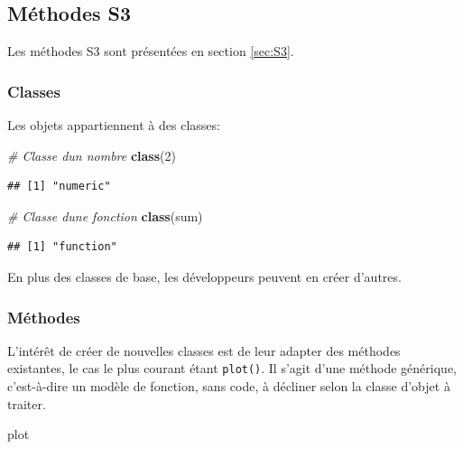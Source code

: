 \documentclass[
  12pt,
  french,
  a4paper,
  extrafontsizes,onecolumn,openright
  ]{memoir}
\newenvironment{Shaded}{\begin{snugshade}}{\end{snugshade}}
\newcommand{\CommentTok}[1]{\textcolor[rgb]{0.56,0.35,0.01}{\textit{#1}}}
\newcommand{\DecValTok}[1]{\textcolor[rgb]{0.00,0.00,0.81}{#1}}
\newcommand{\FunctionTok}[1]{\textcolor[rgb]{0.13,0.29,0.53}{\textbf{#1}}}
\newcommand{\NormalTok}[1]{#1}
\begin{document}
\subsection{Méthodes S3}\label{muxe9thodes-s3}

Les méthodes S3 sont présentées en section \ref{sec:S3}.

\subsubsection{Classes}\label{classes}

Les objets appartiennent à des classes:

\scriptsize

\begin{Shaded}
\begin{Highlighting}[]
\CommentTok{\# Classe d\textquotesingle{}un nombre}
\FunctionTok{class}\NormalTok{(}\DecValTok{2}\NormalTok{)}
\end{Highlighting}
\end{Shaded}

\begin{verbatim}
## [1] "numeric"
\end{verbatim}

\begin{Shaded}
\begin{Highlighting}[]
\CommentTok{\# Classe d\textquotesingle{}une fonction}
\FunctionTok{class}\NormalTok{(sum)}
\end{Highlighting}
\end{Shaded}

\begin{verbatim}
## [1] "function"
\end{verbatim}

\normalsize

En plus des classes de base, les développeurs peuvent en créer d'autres.

\subsubsection{Méthodes}\label{muxe9thodes}

L'intérêt de créer de nouvelles classes est de leur adapter des méthodes existantes, le cas le plus courant étant \texttt{plot()}.
Il s'agit d'une méthode générique, c'est-à-dire un modèle de fonction, sans code, à décliner selon la classe d'objet à traiter.

\scriptsize

\begin{Shaded}
\begin{Highlighting}[]
\NormalTok{plot}
\end{Highlighting}
\end{Shaded}
\end{document}

